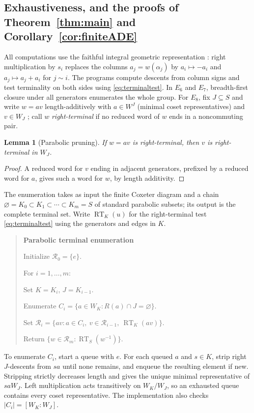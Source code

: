 \documentclass[10pt]{article}
\newtheorem{lemma}[theorem]{Lemma}
\theoremstyle{remark}
\begin{document}
\subsection{Exhaustiveness, and the proofs of Theorem~\ref{thm:main} and
Corollary~\ref{cor:finiteADE}}\label{sec:exhaustive}
All computations use the faithful integral geometric representation
\cite[Theorem~4.2.7]{BB}: right
multiplication by $s_i$ replaces the columns $a_j=w(\alpha_j)$ by
$a_i\mapsto-a_i$ and $a_j\mapsto a_j+a_i$ for $j\sim i$. The programs
compute descents from column signs and test terminality on both sides
using \eqref{eq:terminaltest}. In
$E_6$ and $E_7$, breadth-first closure under all generators enumerates the
whole group. For $E_8$, fix $J\subseteq S$ and write $w=av$
length-additively with $a\in W^J$ (minimal coset representatives) and
$v\in W_J$ \cite[Proposition~2.4.4 and Corollary~2.4.5]{BB}; call $w$ \emph{right-terminal} if no reduced word of $w$ ends
in a noncommuting pair.
\begin{lemma}[Parabolic pruning]\label{lem:pruning}
If $w=av$ is right-terminal, then $v$ is right-terminal in $W_J$.
\end{lemma}
\begin{proof}
A reduced word for $v$ ending in adjacent generators, prefixed by a
reduced word for $a$, gives such a word for $w$, by length additivity.
\end{proof}
The enumeration takes as input the finite Coxeter diagram and a chain
$\varnothing=K_0\subset K_1\subset\cdots\subset K_m=S$ of standard
parabolic subsets; its output is the complete terminal set. Write
$\operatorname{RT}_K(u)$ for the right-terminal test
\eqref{eq:terminaltest} using the generators and edges in $K$.
\begin{quote}\small
\textbf{Parabolic terminal enumeration}\par
Initialize $\mathcal R_0=\{e\}$.\par
For $i=1,\ldots,m$:\par
\hspace*{1em}Set $K=K_i$, $J=K_{i-1}$.\par
\hspace*{1em}Enumerate $C_i=\{a\in W_K:R(a)\cap J=\varnothing\}$.\par
\hspace*{1em}Set $\mathcal R_i=\{av:a\in C_i,\ v\in\mathcal R_{i-1},
\ \operatorname{RT}_K(av)\}$.\par
Return $\{w\in\mathcal R_m:\operatorname{RT}_S(w^{-1})\}$.
\end{quote}
To enumerate $C_i$, start a queue with $e$. For each queued $a$ and
$s\in K$, strip right $J$-descents from $sa$ until none remains, and
enqueue the resulting element if new. Stripping strictly decreases
length and gives the unique minimal representative of $saW_J$.
Left multiplication acts transitively on $W_K/W_J$, so an exhausted
queue contains every coset representative. The implementation also
checks $|C_i|=[W_K:W_J]$.
\end{document}
